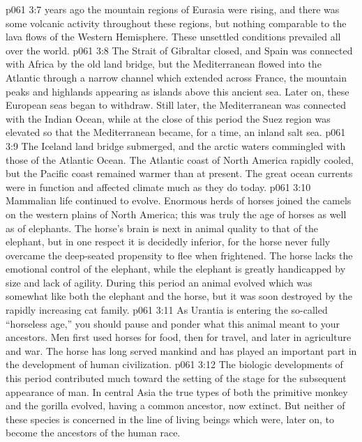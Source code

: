 \vs p061 3:7 \pc {} years ago the mountain regions of Eurasia were rising, and there was some volcanic activity throughout these regions, but nothing comparable to the lava flows of the Western Hemisphere. These unsettled conditions prevailed all over the world.
\vs p061 3:8 The Strait of Gibraltar closed, and Spain was connected with Africa by the old land bridge, but the Mediterranean flowed into the Atlantic through a narrow channel which extended across France, the mountain peaks and highlands appearing as islands above this ancient sea. Later on, these European seas began to withdraw. Still later, the Mediterranean was connected with the Indian Ocean, while at the close of this period the Suez region was elevated so that the Mediterranean became, for a time, an inland salt sea.
\vs p061 3:9 The Iceland land bridge submerged, and the arctic waters commingled with those of the Atlantic Ocean. The Atlantic coast of North America rapidly cooled, but the Pacific coast remained warmer than at present. The great ocean currents were in function and affected climate much as they do today.
\vs p061 3:10 Mammalian life continued to evolve. Enormous herds of horses joined the camels on the western plains of North America; this was truly the age of horses as well as of elephants. The horse’s brain is next in animal quality to that of the elephant, but in one respect it is decidedly inferior, for the horse never fully overcame the deep\hyp{}seated propensity to flee when frightened. The horse lacks the emotional control of the elephant, while the elephant is greatly handicapped by size and lack of agility. During this period an animal evolved which was somewhat like both the elephant and the horse, but it was soon destroyed by the rapidly increasing cat family.
\vs p061 3:11 \pc As Urantia is entering the so\hyp{}called “horseless age,” you should pause and ponder what this animal meant to your ancestors. Men first used horses for food, then for travel, and later in agriculture and war. The horse has long served mankind and has played an important part in the development of human civilization.
\vs p061 3:12 \pc The biologic developments of this period contributed much toward the setting of the stage for the subsequent appearance of man. In central Asia the true types of both the primitive monkey and the gorilla evolved, having a common ancestor, now extinct. But neither of these species is concerned in the line of living beings which were, later on, to become the ancestors of the human race.
